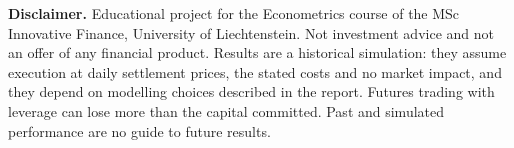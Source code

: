 \documentclass[9pt,a4paper]{extarticle}
\begin{document}
\vfill
\noindent{\color{rulegrey}\hrule}
\vspace{3pt}
{\scriptsize\color{muted}\textbf{Disclaimer.} Educational project for the Econometrics course of the MSc Innovative Finance, University of Liechtenstein. Not investment advice and not an offer of any financial product. Results are a historical simulation: they assume execution at daily settlement prices, the stated costs and no market impact, and they depend on modelling choices described in the report. Futures trading with leverage can lose more than the capital committed. Past and simulated performance are no guide to future results.}
\end{document}
